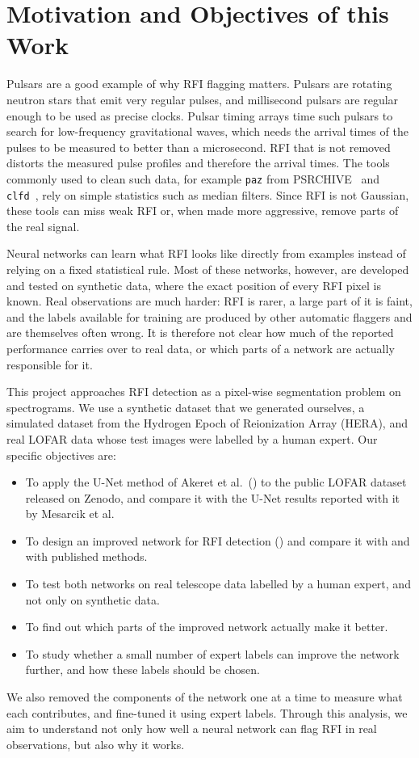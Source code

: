 \section{Motivation and Objectives of this Work}
Pulsars are a good example of why RFI flagging matters. Pulsars are rotating
neutron stars that emit very regular pulses, and millisecond pulsars are
regular enough to be used as precise clocks. Pulsar timing arrays time such
pulsars to search for low-frequency gravitational waves, which needs the
arrival times of the pulses to be measured to better than a microsecond. RFI
that is not removed distorts the measured pulse profiles and therefore the
arrival times. The tools commonly used to clean such data, for example
\texttt{paz} from PSRCHIVE~\cite{vanstraten2012psrchive} and
\texttt{clfd}~\cite{clfd}, rely on simple statistics such as median
filters. Since RFI is not Gaussian, these tools can miss weak RFI or, when made
more aggressive, remove parts of the real signal.

Neural networks can learn what RFI looks like directly from examples instead
of relying on a fixed statistical rule. Most of these networks, however, are
developed and tested on synthetic data, where the exact position of every RFI
pixel is known. Real observations are much harder: RFI is rarer, a large part
of it is faint, and the labels available for training are produced by other
automatic flaggers and are themselves often wrong. It is therefore not clear
how much of the reported performance carries over to real data, or which parts
of a network are actually responsible for it.

This project approaches RFI detection as a pixel-wise segmentation problem on
spectrograms. We use a synthetic dataset that we generated ourselves, a
simulated dataset from the Hydrogen Epoch of Reionization Array (HERA), and
real LOFAR data whose test images were labelled by a human expert. Our specific
objectives are:
\begin{itemize}
  \item To apply the U-Net method of Akeret et al.\ (\tfunet{}) to the
    public LOFAR dataset released on Zenodo, and compare it with the U-Net
    results reported with it by Mesarcik et al.
  \item To design an improved network for RFI detection (\hybrid{}) and compare
    it with \tfunet{} and with published methods.
  \item To test both networks on real telescope data labelled by a human
    expert, and not only on synthetic data.
  \item To find out which parts of the improved network actually make it
    better.
  \item To study whether a small number of expert labels can improve the
    network further, and how these labels should be chosen.
\end{itemize}

We also removed the components of the network
one at a time to measure what each contributes, and fine-tuned it using expert
labels. Through this analysis, we aim to understand not only how well a neural
network can flag RFI in real observations, but also why it works.
